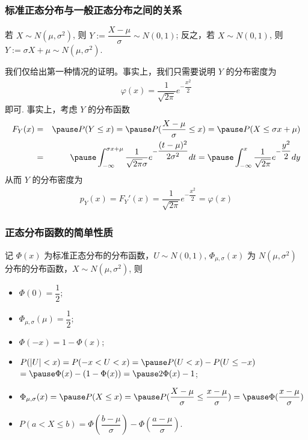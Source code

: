 \begin{frame}
	\frametitle{标准正态分布与一般正态分布之间的关系}
	\begin{exam}
		若 $X\sim N (\mu,\sigma^2)$, 则 $Y:=\dfrac{X-\mu}{\sigma}\sim N (0,1)$; 反之，若 $X\sim N (0,1)$, 则 $Y:=\sigma X+\mu\sim N (\mu,\sigma^2)$.
	\end{exam}

	\pause \jieda 我们仅给出第一种情况的证明。事实上，我们只需要说明 $Y$ 的分布密度为
	\vspace{-0.7cm}\begin{eqnarray*}
		\varphi(x)=\dfrac{1}{\sqrt{2\pi}}e^{-\dfrac{x^2}{2}}
	\end{eqnarray*}
	即可. \pause 事实上，考虑 $Y$ 的分布函数
	\begin{eqnarray*}
		F_Y(x)&=&\pause P(Y\le x)=\pause P(\dfrac{X-\mu}{\sigma}\le x)=\pause P(X\le \sigma x+\mu)\\
		&=&\pause \int_{-\infty}^{\sigma x+\mu}\dfrac{1}{\sqrt{2\pi}\sigma}e^{-\dfrac{(t-\mu)^2}{2\sigma^2}}dt=\pause \int_{-\infty}^x\dfrac{1}{\sqrt{2\pi}}e^{-\dfrac{y^2}{2}}dy
	\end{eqnarray*}
	\pause 从而 $Y$ 的分布密度为
	\begin{eqnarray*}
		p_Y(x)=F_Y'(x)=\dfrac{1}{\sqrt{2\pi}}e^{-\dfrac{x^2}{2}}=\varphi(x)
	\end{eqnarray*}
\end{frame}
\begin{frame}
	\frametitle{正态分布函数的简单性质}
	记 $\Phi (x)$ 为标准正态分布的分布函数，$U\sim N (0,1)$,  $\Phi_{\mu,\sigma}(x)$ 为 $N (\mu,\sigma^2)$ 分布的分布函数，$X\sim N (\mu,\sigma^2)$, 则 \pause
	\begin{itemize}[<+-|alert@+>]
		\item $\Phi(0)=\dfrac{1}{2}$;
		\item $\Phi_{\mu,\sigma}(\mu)=\dfrac{1}{2}$;
		\item $\Phi(-x)=1-\Phi(x)$;
		\item $P(|U|<x)=P(-x<U<x)=\pause P(U<x)-P(U\le -x)$ $=\pause \Phi(x)-(1-\Phi(x))=\pause 2\Phi(x)-1$;
		\item $\Phi_{\mu,\sigma}(x)=\pause P(X\le x)=\pause P(\dfrac{X-\mu}{\sigma}\le \dfrac{x-\mu}{\sigma})=\pause \Phi(\dfrac{x-\mu}{\sigma})$\pause
		\item $P(a<X\le b)=\Phi(\dfrac{b-\mu}{\sigma})-\Phi(\dfrac{a-\mu}{\sigma})$.
	\end{itemize}

\end{frame}
